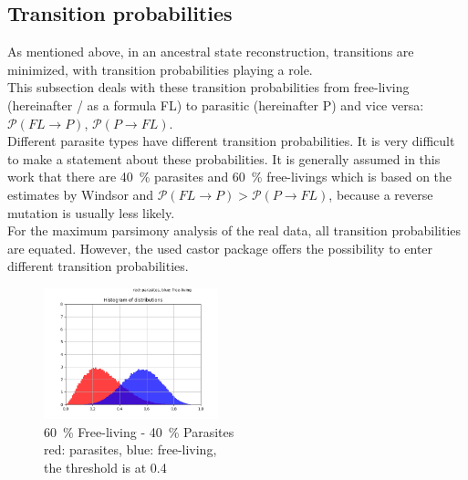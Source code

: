     \subsection{Transition probabilities}
      As mentioned above, in an ancestral state reconstruction, transitions are minimized, with 
        transition probabilities playing a role. \\
      This subsection deals with these transition probabilities from free-living (hereinafter / as a 
        formula FL) to parasitic (hereinafter P) and vice versa: $\mathcal{P}(FL \rightarrow P)$, 
        $\mathcal{P}(P \rightarrow FL)$. \\
      Different parasite types have different transition probabilities. It is very difficult to make a 
        statement about these probabilities. It is generally assumed in this work that there are 40~\% 
        parasites and 60~\% free-livings which is based on the estimates by Windsor \cite{Windsor1998} 
        and $\mathcal{P}(FL \rightarrow P) > \mathcal{P}(P \rightarrow FL)$, because a reverse mutation 
        is usually less likely.  \\

      For the maximum parsimony analysis of the real data, all transition probabilities are equated.
        However, the used castor package \cite{Louca2017} offers the possibility to enter different 
        transition probabilities.
      \begin{figure}
        \begin{center}
          \includegraphics[trim = 0mm 0mm 0mm 0mm, clip, width=0.45\textwidth]{Figures/40-60.png}
        \end{center}
        \caption{60~\% Free-living - 40~\% Parasites \\ red: parasites, blue: free-living, \\ the threshold is at 0.4}
        \label{fig:Beta distribution}
      \end{figure}

